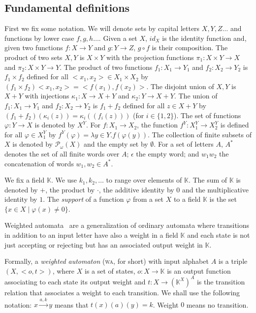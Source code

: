 \documentclass[3p]{elsarticle}
\def\pow#1{{\mathcal P_\omega}#1}
\def\tr#1{\stackrel{#1}{\to}}          %
\newcommand{\setproduct}{\times} %
\newcommand{\comp}{\circ}               %
\newcommand{\K}{\mathbb{K}}            %
\begin{document}
\subsection{Fundamental definitions}
First we fix some notation. We will denote sets by capital letters
$X,Y,Z\dots $ and functions by lower case $f,g,h\dots$. Given a set
$X$, $id_X$ is the identity function and, given two functions
$f\colon  X\to Y$ and $g\colon  Y \to Z$, $g\comp f$ is their
composition. The product of two sets $X,Y$ is $X \setproduct Y$ with
the projection functions $\pi_1 \colon X\times Y \to X$ and $\pi_2 \colon X\times
Y \to Y$. The product of two functions $f_1\colon X_1 \to Y_1$ and
$f_2\colon X_2 \to Y_2$ is $f_1\setproduct f_2$ defined for all
$<x_1,x_2>\in X_1\setproduct X_2$ by $(f_1\setproduct
f_2)<x_1,x_2>=<f(x_1),f(x_2)>$. The disjoint union of $X, Y$ is
$X+Y$ with injections $\kappa_1\colon X \to X+Y$ and $\kappa_2\colon Y \to X+Y$.
The union of $f_1\colon X_1 \to Y_1$ and $f_2\colon X_2 \to Y_2$ is
$f_1+f_2$ defined for all $z\in X+Y$ by
$(f_1+f_2)(\kappa_i(z))=\kappa_i((f_i(z)))$ (for $i \in \{1,2\}$).
 The set of functions $\varphi\colon
Y \to X$ is denoted by $X^Y$. For $f\colon X_1 \to X_2$, the
function $f^Y\colon X_1^Y \to X_2^Y$ is defined for all $ \varphi
\in X_1^Y$ by $f^Y(\varphi)=\lambda y \in Y. f(\varphi (y))$. The
collection of finite subsets of $X$ is denoted by $\pow (X)$ and the
empty set by $\emptyset$. For a set of letters $A$, $A^*$ denotes the
set of all finite words over $A$; $\epsilon$ the empty word; and $w_1w_2$
the concatenation of words $w_1,w_2 \in A^*$.

We fix a field $\mathbb K$. We use $k_1,k_2, \dots$ to range over
elements of $\mathbb K$. The sum of $\mathbb K$ is denoted by $+$,
the product by $\cdot$, the additive identity by $0$ and the
multiplicative identity by $1$. The \emph{support} of a function
$\varphi$ from a set $X$ to a field $\mathbb K$ is the set $\{x\in X
\mid \varphi(x)\neq 0\}$.

\medskip

Weighted automata~\cite{Schutzenberger61b,wahandbook} are a
generalization of ordinary automata where transitions in addition to
an input letter have also a weight in a field $\K$ and each state is
not just accepting or rejecting but has an associated output weight
in $\K$.

Formally, a \emph{weighted automaton} (\textsc{wa}, for short) with
input alphabet $A$ is a triple $(X,<o,t>)$, where $X$ is a set of
states, $o\colon  X \to \K$ is an output function associating to
each state its output weight and $t\colon  X \to (\K^X)^A$ is the
transition relation that associates a weight to each transition. We
shall use the following notation: $x\tr{a,k}y$ means that
$t(x)(a)(y)=k$. Weight $0$ means no transition.
\end{document}
